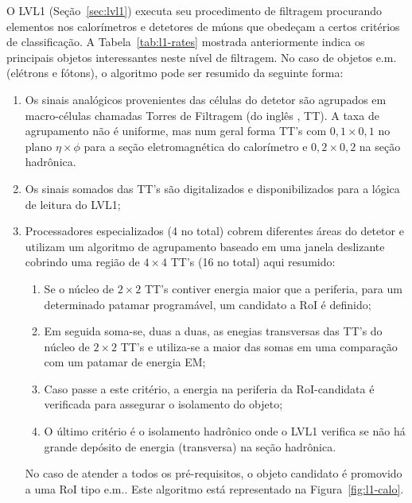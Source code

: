 O LVL1 (Seção~\ref{sec:lvl1}) executa seu procedimento de filtragem procurando
elementos nos calorímetros e detetores de múons que obedeçam a certos
critérios de classificação. A Tabela~\ref{tab:l1-rates} mostrada anteriormente
indica os principais objetos interessantes neste nível de filtragem. No caso
de objetos e.m. (elétrons e fótons), o algoritmo pode ser resumido da seguinte
forma:

\begin{enumerate}
\item Os sinais analógicos provenientes das células do detetor são agrupados
em macro-células chamadas Torres de Filtragem (do inglês ,
TT). A taxa de agrupamento não é uniforme, mas num geral forma TT's com
$0,1\times0,1$ no plano $\eta\times\phi$ para a seção eletromagnética do
calorímetro e $0,2\times0,2$ na seção hadrônica.

\item Os sinais somados das TT's são digitalizados e disponibilizados para a
lógica de leitura do LVL1;

\item Processadores especializados (4 no total) cobrem diferentes áreas do
detetor e utilizam um algoritmo de agrupamento baseado em uma janela
deslizante \cite{l1-tdr} cobrindo uma região de $4\times4$ TT's (16 no
total) aqui resumido:

\begin{enumerate}
\item Se o núcleo de $2\times2$ TT's contiver energia maior que a
periferia, para um determinado patamar programável, um candidato a RoI é
definido;

\item Em seguida soma-se, duas a duas, as enegias transversas das TT's do
núcleo de $2\times2$ TT's e utiliza-se a maior das somas em uma comparação com
um patamar de energia EM;

\item Caso passe a este critério, a energia na periferia da RoI-candidata é
verificada para assegurar o isolamento do objeto; 

\item O último critério é o isolamento hadrônico onde o LVL1 verifica se não
há grande depósito de energia (transversa) na seção hadrônica.
\end{enumerate}  

No caso de atender a todos os pré-requisitos, o objeto candidato é promovido a
uma RoI tipo e.m.. Este algoritmo está representado na
Figura~\ref{fig:l1-calo}.
\end{enumerate}

